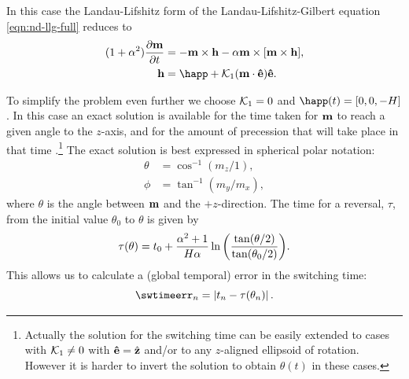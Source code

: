 In this case the Landau-Lifshitz form of the Landau-Lifshitz-Gilbert equation \cref{eqn:nd-llg-full} reduces to
\begin{equation}
  \begin{aligned}
    (1 + \dampc^2) \dmdt &= - \mv \times \hv - \dampc \mv \times \bigs{\mv \times \hv}, \\
    \hv &= \happ + \kone (\mv \cdot \ev) \ev.
    \label{eqn:nd-ode-llg}
  \end{aligned}
\end{equation}

To simplify the problem even further we choose $\mathcal{K}_1 = 0$ and $\happ(t) = [0, 0, -H]$.
In this case an exact solution is available for the time taken for $\boldsymbol{\mathrm{m}}$ to reach a given angle to the $z$-axis, and for the amount of precession that will take place in that time \cite{Mallinson2000}.\footnote{Actually the solution for the switching time can be easily extended to cases with $\mathcal{K}_1 \neq 0$ with $\boldsymbol{\mathrm{\hat{e}}} = {\hat{\mathbf{z}}}$ and/or to any $z$-aligned ellipsoid of rotation.
However it is harder to invert the solution to obtain $\theta(t)$ in these cases.}
The exact solution is best expressed in spherical polar notation:
\begin{equation}
  \begin{aligned}
    \theta &= \cos^{-1}(m_z/1),\\
    \phi &= \tan^{-1}(m_y/m_x),
  \end{aligned}
\end{equation}
where $\theta$ is the angle between $\boldsymbol{\mathrm{m}}$ and the $+z$-direction.
The time for a reversal, $\tau$, from the initial value $\theta_0$ to $\theta$ is given by
\begin{equation}
  \tau(\theta) = t_0 + \frac{\alpha^2 +1}{H \alpha}
  \ln {\left(  \frac{\tan(\theta/2)}{\tan(\theta_0/2)}  \right)}.
  \label{eq:74}
\end{equation}
This allows us to calculate a (global temporal) error in the switching time:
\begin{equation}
  \swtimeerr_n = \abs{t_n - \tau(\theta_n)}.
  \label{eq:sw-time-error}
\end{equation}

